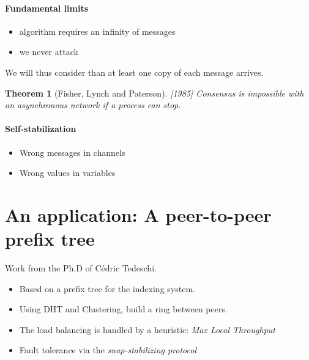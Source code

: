 \documentclass{article}
\newtheorem{thm}{Theorem}
\begin{document}
\paragraph{Fundamental limits}
\begin{itemize}[noitemsep]
\item algorithm requires an infinity of messages
\item we never attack
\end{itemize}

We will thus consider than at least one copy of each message arrives.

\begin{thm}[Fisher, Lynch and Paterson][1985]
	Consensus is impossible with an asynchronous network if a process can stop.
\end{thm}



\paragraph{Self-stabilization}
\begin{itemize}[noitemsep]
\item Wrong messages in channels
\item Wrong values in variables
\end{itemize}



\section{An application: A peer-to-peer prefix tree}
Work from the Ph.D of Cédric Tedeschi.

\begin{itemize}
\item Based on a prefix tree for the indexing system.
\item Using DHT and Clustering, build a ring between peers.
\item The load balancing is handled by a heuristic: \emph{Max Local Throughput}
\item Fault tolerance via the \emph{snap-stabilizing protocol}
\end{itemize}
\end{document}
